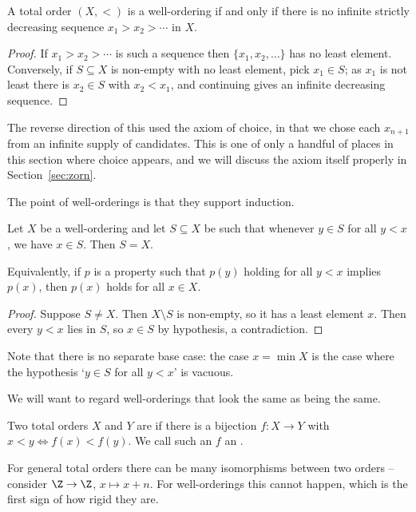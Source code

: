 \begin{proposition}
  A total order $(X, <)$ is a well-ordering if and only if there is no infinite strictly decreasing sequence $x_1 > x_2 > \cdots$ in $X$.
\end{proposition}
\begin{proof}
  If $x_1 > x_2 > \cdots$ is such a sequence then $\{x_1, x_2, \dots\}$ has no least element. Conversely, if $S \subseteq X$ is non-empty with no least element, pick $x_1 \in S$; as $x_1$ is not least there is $x_2 \in S$ with $x_2 < x_1$, and continuing gives an infinite decreasing sequence.
\end{proof}

The reverse direction of this used the axiom of choice, in that we chose each $x_{n+1}$ from an infinite supply of candidates. This is one of only a handful of places in this section where choice appears, and we will discuss the axiom itself properly in Section~\ref{sec:zorn}.

The point of well-orderings is that they support induction.

\begin{proposition}\label{prop:woinduction}
  Let $X$ be a well-ordering and let $S \subseteq X$ be such that whenever $y \in S$ for all $y < x$, we have $x \in S$. Then $S = X$.

  Equivalently, if $p$ is a property such that $p(y)$ holding for all $y < x$ implies $p(x)$, then $p(x)$ holds for all $x \in X$.
\end{proposition}
\begin{proof}
  Suppose $S \neq X$. Then $X \setminus S$ is non-empty, so it has a least element $x$. Then every $y < x$ lies in $S$, so $x \in S$ by hypothesis, a contradiction.
\end{proof}

Note that there is no separate base case: the case $x = \min X$ is the case where the hypothesis `$y \in S$ for all $y < x$' is vacuous.

We will want to regard well-orderings that look the same as being the same.

\begin{definition}
  Two total orders $X$ and $Y$ are  if there is a bijection $f: X \rightarrow Y$ with $x < y \iff f(x) < f(y)$. We call such an $f$ an .
\end{definition}

For general total orders there can be many isomorphisms between two orders -- consider $\Z \to \Z$, $x \mapsto x + n$. For well-orderings this cannot happen, which is the first sign of how rigid they are.


